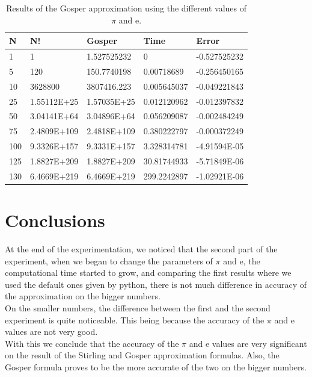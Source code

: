 \documentclass{article}
\begin{document}
 
\begin{table}[h!]
\centering
 \caption{Results of the Gosper approximation using the different values of $\pi$ and e.} 
 \label{ta5}
 \begin{tabular} {| l | l | l | l | l | }
 \hline
\textbf{N}	&	\textbf{N!}	&	\textbf{Gosper}	&	\textbf{Time}	&	\textbf{Error}	\\
\hline
1	&	1	&	1.527525232	&	0	&	-0.527525232	\\
\hline
5	&	120	&	150.7740198	&	0.00718689	&	-0.256450165	\\
\hline
10	&	3628800	&	3807416.223	&	0.005645037	&	-0.049221843	\\
\hline
25	&	1.55112E+25	&	1.57035E+25	&	0.012120962	&	-0.012397832	\\
\hline
50	&	3.04141E+64	&	3.04896E+64	&	0.056209087	&	-0.002484249	\\
\hline
75	&	2.4809E+109	&	2.4818E+109	&	0.380222797	&	-0.000372249	\\
\hline
100	&	9.3326E+157	&	9.3331E+157	&	3.328314781	&	-4.91594E-05	\\
\hline
125	&	1.8827E+209	&	1.8827E+209	&	30.81744933	&	-5.71849E-06	\\
\hline
130	&	6.4669E+219	&	6.4669E+219	&	299.2242897	&	-1.02921E-06	\\
\hline
 \end{tabular}
 \end{table}
 
 \section{Conclusions} 
 
 At the end of the experimentation, we noticed that the second part of the experiment, when we began to change the parameters of $\pi$ and e, the computational time started to grow, and comparing the first results where we used the default ones given by python, there is not much difference in accuracy of the approximation on the bigger numbers.\\
 
 On the smaller numbers, the difference between the first and the second experiment is quite noticeable. This being because the accuracy of the $\pi$ and e values are not very good.\\
 
With this we conclude that the accuracy of the $\pi$ and e values are very significant on the result of the Stirling and Gosper approximation formulas. Also, the Gosper formula proves to be the more accurate of the two on the bigger numbers.\\
 
\end{document}

